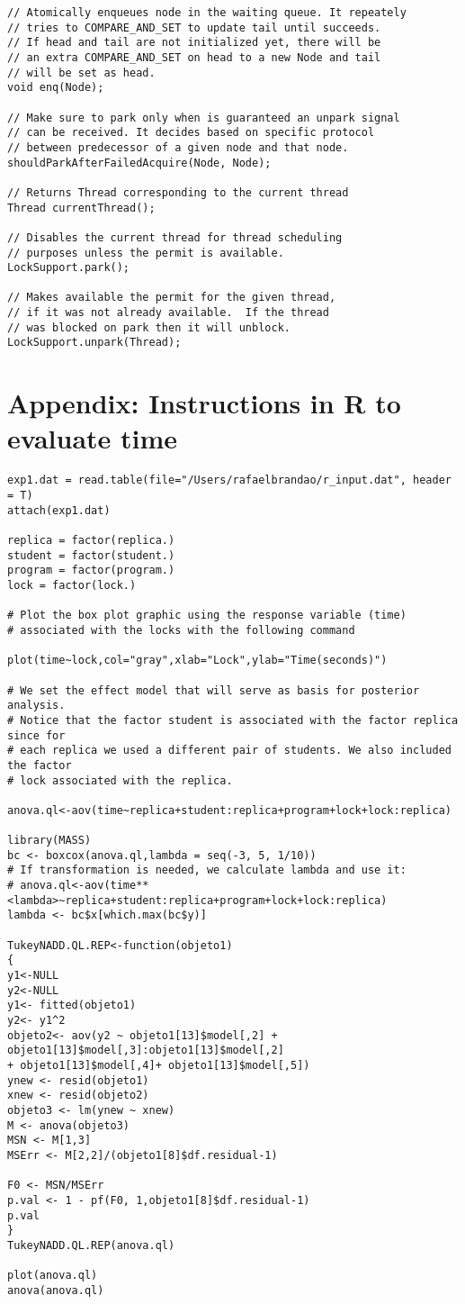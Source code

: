 \begin{verbatim}
// Atomically enqueues node in the waiting queue. It repeately
// tries to COMPARE_AND_SET to update tail until succeeds.
// If head and tail are not initialized yet, there will be
// an extra COMPARE_AND_SET on head to a new Node and tail
// will be set as head.
void enq(Node);

// Make sure to park only when is guaranteed an unpark signal
// can be received. It decides based on specific protocol
// between predecessor of a given node and that node.
shouldParkAfterFailedAcquire(Node, Node);

// Returns Thread corresponding to the current thread
Thread currentThread();

// Disables the current thread for thread scheduling
// purposes unless the permit is available.
LockSupport.park();

// Makes available the permit for the given thread,
// if it was not already available.  If the thread
// was blocked on park then it will unblock.
LockSupport.unpark(Thread);
\end{verbatim}


\section*{Appendix: Instructions in R to evaluate time}
\noindent
\begin{verbatim}
exp1.dat = read.table(file="/Users/rafaelbrandao/r_input.dat", header = T)
attach(exp1.dat)

replica = factor(replica.)
student = factor(student.)
program = factor(program.)
lock = factor(lock.)

# Plot the box plot graphic using the response variable (time)
# associated with the locks with the following command

plot(time~lock,col="gray",xlab="Lock",ylab="Time(seconds)")

# We set the effect model that will serve as basis for posterior analysis.
# Notice that the factor student is associated with the factor replica since for
# each replica we used a different pair of students. We also included the factor
# lock associated with the replica.

anova.ql<-aov(time~replica+student:replica+program+lock+lock:replica)

library(MASS)
bc <- boxcox(anova.ql,lambda = seq(-3, 5, 1/10))
# If transformation is needed, we calculate lambda and use it:
# anova.ql<-aov(time**<lambda>~replica+student:replica+program+lock+lock:replica)
lambda <- bc$x[which.max(bc$y)]

TukeyNADD.QL.REP<-function(objeto1)
{
y1<-NULL
y2<-NULL
y1<- fitted(objeto1)
y2<- y1^2
objeto2<- aov(y2 ~ objeto1[13]$model[,2] +
objeto1[13]$model[,3]:objeto1[13]$model[,2]
+ objeto1[13]$model[,4]+ objeto1[13]$model[,5])
ynew <- resid(objeto1)
xnew <- resid(objeto2)
objeto3 <- lm(ynew ~ xnew)
M <- anova(objeto3)
MSN <- M[1,3]
MSErr <- M[2,2]/(objeto1[8]$df.residual-1)

F0 <- MSN/MSErr
p.val <- 1 - pf(F0, 1,objeto1[8]$df.residual-1)
p.val
}
TukeyNADD.QL.REP(anova.ql)

plot(anova.ql)
anova(anova.ql)
\end{verbatim}

